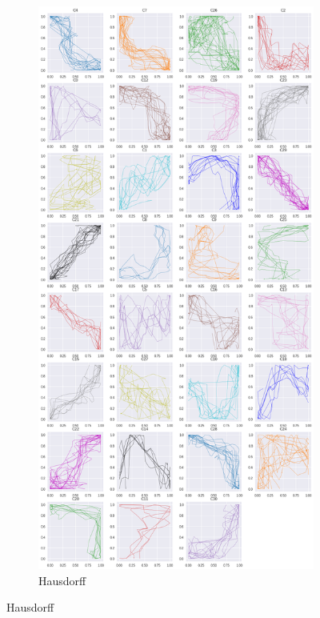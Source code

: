 \begin{figure}[h]
\begin{subfigure}[c]{0.3\linewidth}
     \includegraphics[width=\linewidth]{figs/clusters/CLU_AP_ALL[Hd].png}
    \caption{Hausdorff}
  \end{subfigure}
  \hspace{.5em}

\end{figure}

